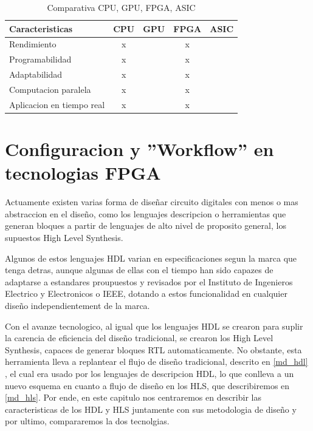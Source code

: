 \documentclass[11pt,spanish,listoffigures,listoftables]{tfgetsinf}
\begin{document}
   \begin{table}[h]
      \begin{center}
         \begin{tabular}{|l|c|c|c|c|}
            \hline
            Caracteristicas           & CPU & GPU & FPGA  & ASIC \\ \hline
            Rendimiento               &  x  &     &  x    &      \\ \hline
            Programabilidad           &  x  &     &  x    &      \\ \hline
            Adaptabilidad             &  x  &     &  x    &      \\ \hline
            Computacion paralela      &  x  &     &  x    &      \\ \hline
            Aplicacion en tiempo real &  x  &     &  x    &      \\ 
            \hline
         \end{tabular}
         \caption{Comparativa CPU, GPU, FPGA, ASIC}
         \label{tab:cpu_gpu_fpga_asic}
      \end{center}
   \end{table}

\chapter{Configuracion y ''Workflow'' en tecnologias FPGA}

   Actuamente existen varias forma de diseñar circuito digitales con menos o mas
   abstraccion en el diseño, como los lenguajes descripcion o herramientas que
   generan bloques a partir de lenguajes de alto nivel de proposito general, los
   supuestos High Level Synthesis.
   
   Algunos de estos lenguajes HDL varian en especificaciones segun la marca que
   tenga detras, aunque algunas de ellas con el tiempo han sido capazes de
   adaptarse a estandares proupuestos y revisados por el Instituto de Ingenieros
   Electrico y Electronicos o IEEE, dotando a estos funcionalidad en cualquier
   diseño independientement de la marca.
   
   Con el avanze tecnologico, al igual que los lenguajes HDL se crearon para
   suplir la carencia de eficiencia del diseño tradicional, se crearon los High
   Level Synthesis, capaces de generar bloques RTL automaticamente. No obstante,
   esta herramienta lleva a replantear el flujo de diseño tradicional, descrito
   en \ref{md_hdl} , el cual era usado por los lenguajes de descripcion HDL, lo
   que conlleva  a un nuevo esquema en cuanto a flujo de diseño en los HLS, que
   describiremos en \ref{md_hls}. Por ende, en este capitulo nos centraremos en
   describir las caracteristicas de los HDL y HLS juntamente con sus metodologia
   de diseño y por ultimo, compararemos la dos tecnolgias.
\end{document}
